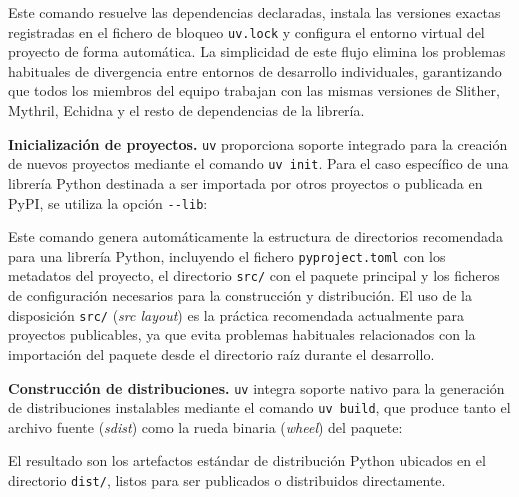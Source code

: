 Este comando resuelve las dependencias declaradas, instala las versiones
exactas registradas en el fichero de bloqueo \texttt{uv.lock} y
configura el entorno virtual del proyecto de forma automática. La
simplicidad de este flujo elimina los problemas habituales de
divergencia entre entornos de desarrollo individuales, garantizando que
todos los miembros del equipo trabajan con las mismas versiones de
Slither, Mythril, Echidna y el resto de dependencias de la librería.

\textbf{Inicialización de proyectos.} \texttt{uv} proporciona soporte
integrado para la creación de nuevos proyectos mediante el comando
\texttt{uv\ init}. Para el caso específico de una librería Python
destinada a ser importada por otros proyectos o publicada en PyPI, se
utiliza la opción \texttt{-\/-lib}:

\begin{Shaded}
\begin{Highlighting}[]
\end{Highlighting}
\end{Shaded}

Este comando genera automáticamente la estructura de directorios
recomendada para una librería Python, incluyendo el fichero
\texttt{pyproject.toml} con los metadatos del proyecto, el directorio
\texttt{src/} con el paquete principal y los ficheros de configuración
necesarios para la construcción y distribución. El uso de la disposición
\texttt{src/} (\emph{src layout}) es la práctica recomendada actualmente
para proyectos publicables, ya que evita problemas habituales
relacionados con la importación del paquete desde el directorio raíz
durante el desarrollo.

\textbf{Construcción de distribuciones.} \texttt{uv} integra soporte
nativo para la generación de distribuciones instalables mediante el
comando \texttt{uv\ build}, que produce tanto el archivo fuente
(\emph{sdist}) como la rueda binaria (\emph{wheel}) del paquete:

\begin{Shaded}
\begin{Highlighting}[]
\end{Highlighting}
\end{Shaded}

El resultado son los artefactos estándar de distribución Python ubicados
en el directorio \texttt{dist/}, listos para ser publicados o
distribuidos directamente.

